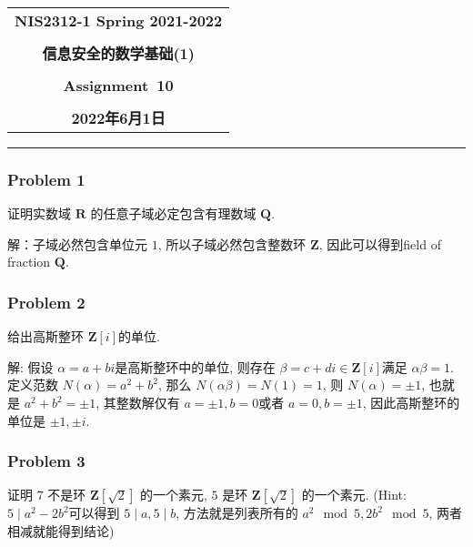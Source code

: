 \documentclass[a4paper,12pt]{ctexart}
\newcommand{\Z}{\mathbf{Z}}
\newcommand{\Q}{\mathbf{Q}}
\newcommand{\R}{\mathbf{R}}
\begin{document}
  \begin{center}

  \vspace{-0.3in}
  \begin{tabular}{c}
    \textbf{\Large NIS2312-1 Spring 2021-2022} \\
    \textbf{\Large  } \\
    \textbf{\Large  信息安全的数学基础(1)}\\
    \textbf{\Large  } \\
    \textbf{\Large  Assignment~10 } \\
    \textbf{\Large  } \\
    \textbf{\Large 2022年6月1日} \\
  \end{tabular}
  \end{center}
  \noindent
  \rule{\linewidth}{0.4pt}

\subsubsection*{Problem 1}
    证明实数域 $ \R $ 的任意子域必定包含有理数域 $ \Q $.

    解：子域必然包含单位元 $ 1 $, 所以子域必然包含整数环 $ \Z $, 因此可以得到field of fraction $ \Q $. 
\subsubsection*{Problem 2}
    给出高斯整环 $ \Z[i] $的单位.

    解: 假设 $ \alpha=a+bi $是高斯整环中的单位, 则存在 $ \beta=c+di\in\Z[i] $满足 $ \alpha\beta=1 $. 定义范数 $ N(\alpha)=a^2+b^2 $,
    那么 $ N(\alpha\beta)=N(1)=1 $, 则 $ N(\alpha)=\pm 1 $, 也就是 $ a^2+b^2=\pm 1 $, 其整数解仅有 $ a=\pm 1,b=0 $或者 $ a=0,b=\pm 1 $, 
    因此高斯整环的单位是 $ \pm 1,\pm i $.
\subsubsection*{Problem 3}
    证明 $ 7 $ 不是环 $ \Z[\sqrt{2}] $ 的一个素元, $ 5 $ 是环 $ \Z[\sqrt{2}] $ 的一个素元.
    (Hint: $ 5\mid a^2-2b^2 $可以得到 $ 5\mid a,5\mid b $, 方法就是列表所有的 $ a^2 \mod{5},2b^2\mod{5} $, 两者相减就能得到结论)
\end{document}
